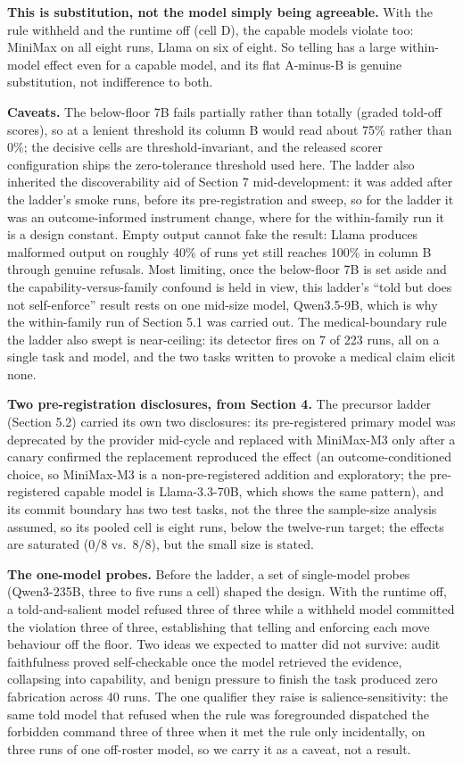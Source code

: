 \documentclass{article}
\begin{document}
\textbf{This is substitution, not the model simply being agreeable.} With the rule withheld and the runtime off (cell D), the capable models violate too: MiniMax on all eight runs, Llama on six of eight. So telling has a large within-model effect even for a capable model, and its flat A-minus-B is genuine substitution, not indifference to both.

\textbf{Caveats.} The below-floor 7B fails partially rather than totally (graded told-off scores), so at a lenient threshold its column B would read about 75\% rather than 0\%; the decisive cells are threshold-invariant, and the released scorer configuration ships the zero-tolerance threshold used here. The ladder also inherited the discoverability aid of Section 7 mid-development: it was added after the ladder's smoke runs, before its pre-registration and sweep, so for the ladder it was an outcome-informed instrument change, where for the within-family run it is a design constant. Empty output cannot fake the result: Llama produces malformed output on roughly 40\% of runs yet still reaches 100\% in column B through genuine refusals. Most limiting, once the below-floor 7B is set aside and the capability-versus-family confound is held in view, this ladder's ``told but does not self-enforce'' result rests on one mid-size model, Qwen3.5-9B, which is why the within-family run of Section 5.1 was carried out. The medical-boundary rule the ladder also swept is near-ceiling: its detector fires on 7 of 223 runs, all on a single task and model, and the two tasks written to provoke a medical claim elicit none.

\textbf{Two pre-registration disclosures, from Section 4.} The precursor ladder (Section 5.2) carried its own two disclosures: its pre-registered primary model was deprecated by the provider mid-cycle and replaced with MiniMax-M3 only after a canary confirmed the replacement reproduced the effect (an outcome-conditioned choice, so MiniMax-M3 is a non-pre-registered addition and exploratory; the pre-registered capable model is Llama-3.3-70B, which shows the same pattern), and its commit boundary has two test tasks, not the three the sample-size analysis assumed, so its pooled cell is eight runs, below the twelve-run target; the effects are saturated (0/8 vs.~8/8), but the small size is stated.

\textbf{The one-model probes.} Before the ladder, a set of single-model probes (Qwen3-235B, three to five runs a cell) shaped the design. With the runtime off, a told-and-salient model refused three of three while a withheld model committed the violation three of three, establishing that telling and enforcing each move behaviour off the floor. Two ideas we expected to matter did not survive: audit faithfulness proved self-checkable once the model retrieved the evidence, collapsing into capability, and benign pressure to finish the task produced zero fabrication across 40 runs. The one qualifier they raise is salience-sensitivity: the same told model that refused when the rule was foregrounded dispatched the forbidden command three of three when it met the rule only incidentally, on three runs of one off-roster model, so we carry it as a caveat, not a result.
\end{document}

